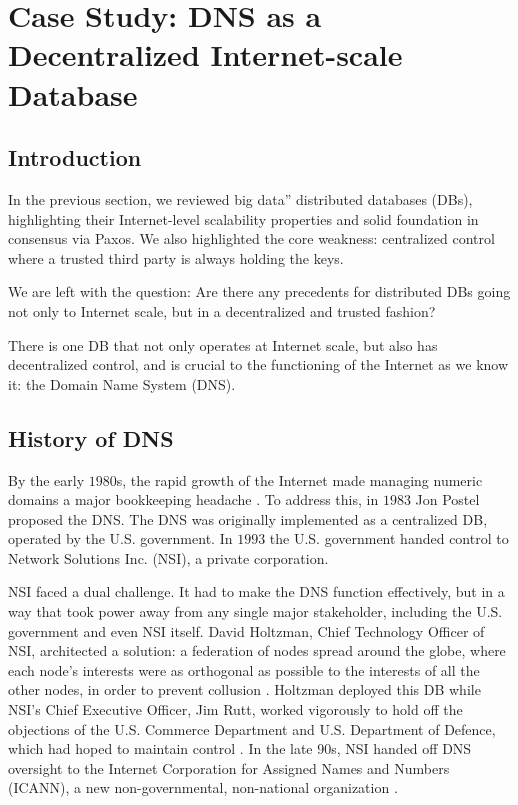\section{Case Study: DNS as a Decentralized Internet-scale Database}\label{sec:dns}

\subsection{Introduction}
In the previous section, we reviewed big data” distributed databases (DBs), highlighting their Internet-level scalability properties and solid foundation in consensus via Paxos.
We also highlighted the core weakness: centralized control where a trusted third party is always holding the keys.

We are left with the question: Are there any precedents for distributed DBs going not only to Internet scale, but in a decentralized and trusted fashion?

There is one DB that not only operates at Internet scale, but also has decentralized control, and is crucial to the functioning of the Internet as we know it: the Domain Name System (DNS).

\subsection{History of DNS}

By the early $1980$s, the rapid growth of the Internet made managing numeric domains a major bookkeeping headache \cite{dnshistory}.
To address this, in $1983$ Jon Postel proposed the DNS.
The DNS was originally implemented as a centralized DB, operated by the U.S. government.
In $1993$ the U.S. government handed control to Network Solutions Inc. (NSI), a private corporation.

NSI faced a dual challenge. It had to make the DNS function effectively, but in a way that took power away from any single major stakeholder, including the U.S. government and even NSI itself.
David Holtzman, Chief Technology Officer of NSI, architected a solution: a federation of nodes spread around the globe, where each node’s interests were as orthogonal as possible to the interests of all the other nodes, in order to prevent collusion \cite{dnshistory}.
Holtzman deployed this DB while NSI’s Chief Executive Officer, Jim Rutt, worked vigorously to hold off the objections of the U.S. Commerce Department and U.S. Department of Defence, which had hoped to maintain control \cite{schwartz2001badboy}.
In the late 90s, NSI handed off DNS oversight to the Internet Corporation for Assigned Names and Numbers (ICANN), a new non-governmental, non-national organization \cite{dnshistory}.

